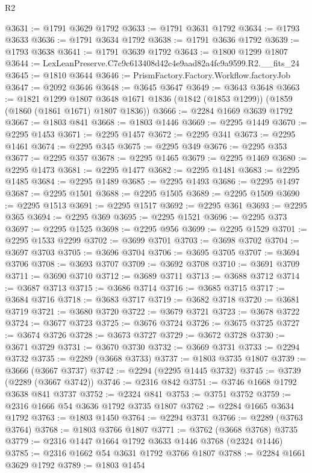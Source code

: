 \begin{lexlean}{R2}
\begin{coremodule}
@3631 := @1791 @3629 @1792
@3633 := @1791 @3631 @1792
@3634 := @1793 @3633
@3636 := @1791 @3634 @1792
@3638 := @1791 @3636 @1792
@3639 := @1793 @3638
@3641 := @1791 @3639 @1792
@3643 := @1800 @1299 @1807
@3644 := LexLeanPreserve.C7c9c613408d42c4e9aad82a4fc9a9599.R2.__fits_24
@3645 := @1810 @3644
@3646 := PrismFactory.Factory.Workflow.factoryJob
@3647 := @2092 @3646
@3648 := @3645 @3647
@3649 := @3643 @3648
@3663 := @1821
    @1299
    @1807
    @3648
    @1671
    @1836
    (@1842 (@1853 @1299))
    (@1859 (@1860 (@1861 @1671) @1807 @1836))
@3666 := @2284 @1669 @3639 @1792
@3667 := @1803 @841
@3668 := @1803 @1446
@3669 := @2295 @1449
@3670 := @2295 @1453
@3671 := @2295 @1457
@3672 := @2295 @341
@3673 := @2295 @1461
@3674 := @2295 @345
@3675 := @2295 @349
@3676 := @2295 @353
@3677 := @2295 @357
@3678 := @2295 @1465
@3679 := @2295 @1469
@3680 := @2295 @1473
@3681 := @2295 @1477
@3682 := @2295 @1481
@3683 := @2295 @1485
@3684 := @2295 @1489
@3685 := @2295 @1493
@3686 := @2295 @1497
@3687 := @2295 @1501
@3688 := @2295 @1505
@3689 := @2295 @1509
@3690 := @2295 @1513
@3691 := @2295 @1517
@3692 := @2295 @361
@3693 := @2295 @365
@3694 := @2295 @369
@3695 := @2295 @1521
@3696 := @2295 @373
@3697 := @2295 @1525
@3698 := @2295 @956
@3699 := @2295 @1529
@3701 := @2295 @1533 @2299
@3702 := @3699 @3701
@3703 := @3698 @3702
@3704 := @3697 @3703
@3705 := @3696 @3704
@3706 := @3695 @3705
@3707 := @3694 @3706
@3708 := @3693 @3707
@3709 := @3692 @3708
@3710 := @3691 @3709
@3711 := @3690 @3710
@3712 := @3689 @3711
@3713 := @3688 @3712
@3714 := @3687 @3713
@3715 := @3686 @3714
@3716 := @3685 @3715
@3717 := @3684 @3716
@3718 := @3683 @3717
@3719 := @3682 @3718
@3720 := @3681 @3719
@3721 := @3680 @3720
@3722 := @3679 @3721
@3723 := @3678 @3722
@3724 := @3677 @3723
@3725 := @3676 @3724
@3726 := @3675 @3725
@3727 := @3674 @3726
@3728 := @3673 @3727
@3729 := @3672 @3728
@3730 := @3671 @3729
@3731 := @3670 @3730
@3732 := @3669 @3731
@3733 := @2294 @3732
@3735 := @2289 (@3668 @3733)
@3737 := @1803 @3735 @1807
@3739 := @3666 (@3667 @3737)
@3742 := @2294 (@2295 @1445 @3732)
@3745 := @3739 (@2289 (@3667 @3742))
@3746 := @2316 @842
@3751 := @3746 @1668 @1792 @3638 @841 @3737
@3752 := @2324 @841
@3753 := @3751 @3752
@3759 := @2316 @1666 @54 @3636 @1792 @3735 @1807
@3762 := @2284 @1665 @3634 @1792
@3763 := @1803 @1450
@3764 := @2294 @3731
@3766 := @2289 (@3763 @3764)
@3768 := @1803 @3766 @1807
@3771 := @3762 (@3668 @3768) @3735
@3779 := @2316 @1447 @1664 @1792 @3633 @1446 @3768 (@2324 @1446)
@3785 := @2316 @1662 @54 @3631 @1792 @3766 @1807
@3788 := @2284 @1661 @3629 @1792
@3789 := @1803 @1454

\end{coremodule}
\end{lexlean}
